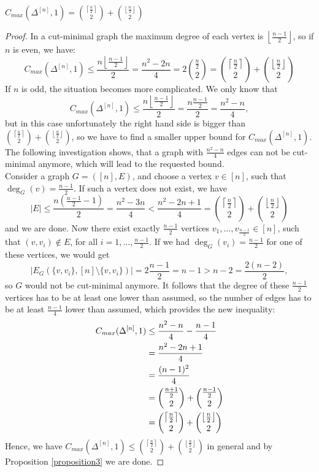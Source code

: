 \begin{thm}\label{theorem1}
\(C_{max}(\Delta^{[n]},1)=\binom{\left\lceil\frac{n}{2}\right\rceil}{2}+\binom{\left\lfloor\frac{n}{2}\right\rfloor}{2}\)
\begin{proof}
In a cut-minimal graph the maximum degree of each vertex is \(\left\lfloor\frac{n-1}{2}\right\rfloor\), so if \(n\) is even, we have:
\[
C_{max}(\Delta^{[n]},1)\leq\frac{n\left\lfloor\frac{n-1}{2}\right\rfloor}{2}=\frac{n^2-2n}{4}=2\binom{\frac{n}{2}}{2}=\binom{\left\lceil\frac{n}{2}\right\rceil}{2}+\binom{\left\lfloor\frac{n}{2}\right\rfloor}{2}
\]
If \(n\) is odd, the situation becomes more complicated. We only know that
\[
C_{max}(\Delta^{[n]},1)\leq\frac{n\left\lfloor\frac{n-1}{2}\right\rfloor}{2}=\frac{n\frac{n-1}{2}}{2}=\frac{n^2-n}{4},
\]
but in this case unfortunately the right hand side is bigger than \(\binom{\left\lceil\frac{n}{2}\right\rceil}{2}+\binom{\left\lfloor\frac{n}{2}\right\rfloor}{2}\), so we have to find a smaller upper bound for \(C_{max}(\Delta^{[n]},1)\). The following investigation shows, that a graph with \(\frac{n^2-n}{4}\) edges can not be cut-minimal anymore, which will lead to the requested bound.\\
Consider a graph \(G=([n],E)\), and choose a vertex \(v\in [n]\), such that\\
\(\deg_G(v)=\frac{n-1}{2}\). If such a vertex does not exist, we have
\[
|E|\leq\frac{n(\frac{n-1}{2}-1)}{2}=\frac{n^2-3n}{4}<\frac{n^2-2n+1}{4}=\binom{\left\lceil\frac{n}{2}\right\rceil}{2}+\binom{\left\lfloor\frac{n}{2}\right\rfloor}{2}
\]
and we are done. Now there exist exactly \(\frac{n-1}{2}\) vertices \(v_1,\ldots,v_{\frac{n-1}{2}}\in [n]\), such that \((v,v_i)\notin E\), for all \(i=1,\ldots,\frac{n-1}{2}\). If we had \(\deg_G(v_i)=\frac{n-1}{2}\) for one of these vertices, we would get
\[
|E_G(\{v,v_i\},[n]\setminus\{v,v_i\})|=2\frac{n-1}{2}=n-1>n-2=\frac{2(n-2)}{2},
\]
so \(G\) would not be cut-minimal anymore. It follows that the degree of these \(\frac{n-1}{2}\) vertices has to be at least one lower than assumed, so the number of edges has to be at least \(\frac{n-1}{4}\) lower than assumed, which provides the new inequality:
\begin{align}
C_{max}(\Delta^{[n]},1)&\leq\frac{n^2-n}{4}-\frac{n-1}{4}\notag\\
&=\frac{n^2-2n+1}{4}\notag\\
&=\frac{(n-1)^2}{4}\notag\\
&=\binom{\frac{n+1}{2}}{2}+\binom{\frac{n-1}{2}}{2}\notag\\
&=\binom{\left\lceil\frac{n}{2}\right\rceil}{2}+\binom{\left\lfloor\frac{n}{2}\right\rfloor}{2}\notag
\end{align}
Hence, we have \(C_{max}(\Delta^{[n]},1)\leq\binom{\left\lceil\frac{n}{2}\right\rceil}{2}+\binom{\left\lfloor\frac{n}{2}\right\rfloor}{2}\) in general and by Proposition \ref{proposition3} we are done.
\end{proof}
\end{thm}

